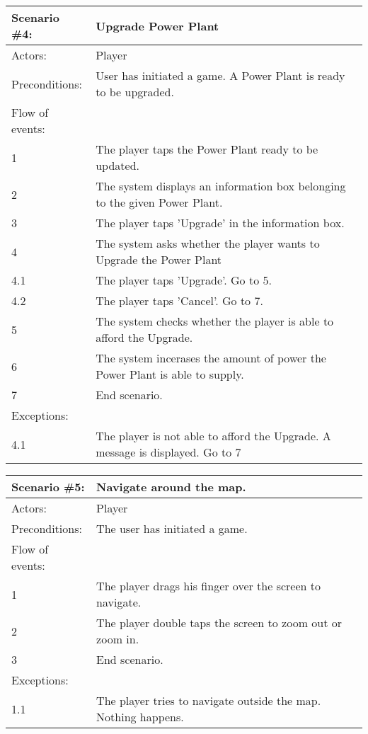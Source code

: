 \begin{tabular}{| l | p{10cm} |}
	\hline
	\rowcolor{lightgray}
	{\bf Scenario \#4:} & {\bf Upgrade Power Plant} \\ \hline
	Actors: & Player \\ \hline
	Preconditions: & User has initiated a game. A Power Plant is ready to be upgraded. \\ \hline
	Flow of events: & \\ \hline
	1 & The player taps the Power Plant ready to be updated. \\ \hline
	2 & The system displays an information box belonging to the given Power Plant. \\ \hline
	3 & The player taps 'Upgrade' in the information box. \\ \hline
	4 & The system asks whether the player wants to Upgrade the Power Plant \\ \hline
	4.1 & The player taps 'Upgrade'. Go to 5. \\ \hline
	4.2 & The player taps 'Cancel'. Go to 7. \\ \hline
	5 & The system checks whether the player is able to afford the Upgrade. \\ \hline
	6 & The system incerases the amount of power the Power Plant is able to supply. \\ \hline
	7 & End scenario. \\ \hline
	Exceptions: & \\ \hline
	4.1 & The player is not able to afford the Upgrade. A message is displayed. Go to 7 \\ \hline 
\end{tabular}

\begin{tabular}{| l | p{10cm} |}
	\hline
	\rowcolor{lightgray}
	{\bf Scenario \#5:} & {\bf Navigate around the map.} \\ \hline
	Actors: & Player \\ \hline
	Preconditions: & The user has initiated a game. \\ \hline
	Flow of events: & \\ \hline
	1 & The player drags his finger over the screen to navigate. \\ \hline
	2 & The player double taps the screen to zoom out or zoom in. \\ \hline
	3 & End scenario. \\ \hline
	Exceptions: & \\ \hline
	1.1 & The player tries to navigate outside the map. Nothing happens. \\ \hline
\end{tabular}

